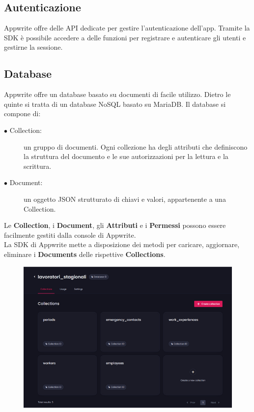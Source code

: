 \documentclass[a4paper, oneside, 12pt]{article}
\begin{document}
\subsection{Autenticazione}
Appwrite offre delle API dedicate per gestire l'autenticazione dell'app. Tramite la SDK è possibile accedere a delle funzioni per 
registrare e autenticare gli utenti e gestirne la sessione.

\subsection{Database}
Appwrite offre un database basato su documenti di facile utilizzo. Dietro le quinte si tratta di un database NoSQL basato su MariaDB. 
Il database si compone di:

\begin{description}
	\item[$\bullet$ Collection:]un gruppo di documenti. Ogni collezione ha degli attributi che definiscono la struttura del documento e le sue 
	autorizzazioni per la lettura e la scrittura.
	\item[$\bullet$ Document:]un oggetto JSON strutturato di chiavi e valori, appartenente a una Collection.
\end{description}

Le \textbf{Collection}, i \textbf{Document}, gli \textbf{Attributi} e i \textbf{Permessi} possono essere facilmente gestiti dalla console di Appwrite. \\
La SDK di Appwrite mette a disposizione dei metodi per caricare, aggiornare, eliminare i \textbf{Documents} delle rispettive \textbf{Collections}.

\begin{figure}[H]
	\centering
	\includegraphics[width = 10 cm]{images/appwrite.png}
	\label{fig:interfaccia Appwrite}
\end{figure}
\end{document}
